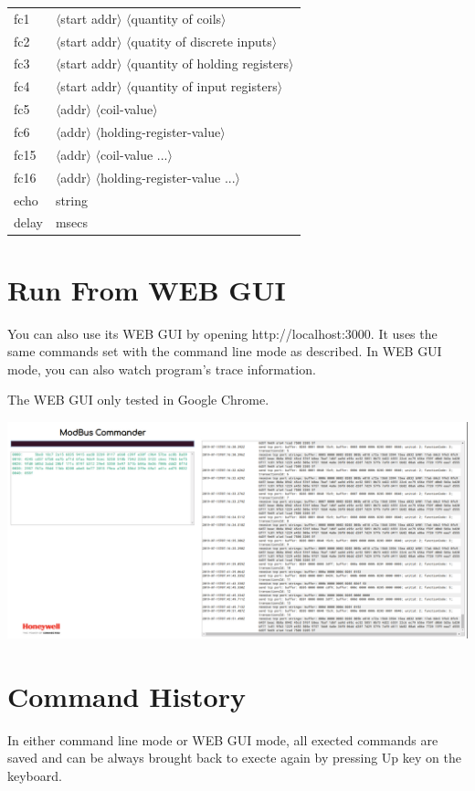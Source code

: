 \documentclass[a4paper,latin]{paper}
\begin{document}
\noindent\begin{tabular}{ll}
    fc1 & $\langle$start addr$\rangle$ $\langle$quantity of coils$\rangle$ \\
    fc2 & $\langle$start addr$\rangle$ $\langle$quatity of discrete inputs$\rangle$ \\
    fc3 & $\langle$start addr$\rangle$ $\langle$quantity of holding registers$\rangle$ \\
    fc4 & $\langle$start addr$\rangle$ $\langle$quantity of input registers$\rangle$ \\
    fc5 & $\langle$addr$\rangle$ $\langle$coil-value$\rangle$ \\
    fc6 & $\langle$addr$\rangle$ $\langle$holding-register-value$\rangle$ \\
    fc15 & $\langle$addr$\rangle$ $\langle$coil-value ...$\rangle$ \\
    fc16 & $\langle$addr$\rangle$ $\langle$holding-register-value ...$\rangle$ \\
    echo & string \\
    delay & msecs \\
\end{tabular}

\section{Run From WEB GUI}
You can also use its WEB GUI by opening http://localhost:3000.  It uses the same commands
set with the command line mode as described.  In WEB GUI mode, you can also watch program's
trace information.

The WEB GUI only tested in Google Chrome.

\includegraphics[width=\textwidth]{webgui.png}

\section{Command History}
In either command line mode or WEB GUI mode, all exected commands are saved and 
can be always brought back to execte again by pressing Up key on the keyboard.
\end{document}

